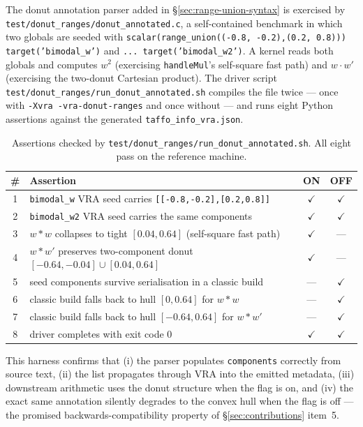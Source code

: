 \documentclass[11pt,a4paper]{article}
\theoremstyle{plain}
\begin{document}
The donut annotation parser added in \S\ref{sec:range-union-syntax}
is exercised by \texttt{test/donut\_ranges/donut\_annotated.c}, a
self-contained benchmark in which two globals are seeded with
\texttt{scalar(range\_union((-0.8,\,-0.2),(0.2,\,0.8))) target('bimodal\_w')}
and \texttt{... target('bimodal\_w2')}. A kernel reads both globals and
computes $w^2$ (exercising \texttt{handleMul}'s self-square fast
path) and $w\cdot w'$ (exercising the two-donut Cartesian product).
The driver script \texttt{test/donut\_ranges/run\_donut\_annotated.sh}
compiles the file twice --- once with \texttt{-Xvra -vra-donut-ranges}
and once without --- and runs eight Python assertions against the
generated \texttt{taffo\_info\_vra.json}.

\begin{table}[H]
\centering
\small
\begin{tabularx}{\linewidth}{@{}cXcc@{}}
\toprule
\# & Assertion & ON & OFF \\
\midrule
1 & \texttt{bimodal\_w} VRA seed carries
    \texttt{[[-0.8,-0.2],[0.2,0.8]]} & $\checkmark$ & $\checkmark$ \\
2 & \texttt{bimodal\_w2} VRA seed carries the same components
    & $\checkmark$ & $\checkmark$ \\
3 & $w*w$ collapses to tight $[0.04, 0.64]$ (self-square fast path)
    & $\checkmark$ & --- \\
4 & $w*w'$ preserves two-component donut
    $[-0.64,-0.04] \cup [0.04, 0.64]$ & $\checkmark$ & --- \\
5 & seed components survive serialisation in a classic build
    & --- & $\checkmark$ \\
6 & classic build falls back to hull $[0, 0.64]$ for $w*w$
    & --- & $\checkmark$ \\
7 & classic build falls back to hull $[-0.64, 0.64]$ for $w*w'$
    & --- & $\checkmark$ \\
8 & driver completes with exit code 0
    & $\checkmark$ & $\checkmark$ \\
\bottomrule
\end{tabularx}
\caption{Assertions checked by
\texttt{test/donut\_ranges/run\_donut\_annotated.sh}. All eight pass
on the reference machine.}
\label{tab:range-union-assertions}
\end{table}

This harness confirms that (i) the parser populates
\texttt{components} correctly from source text, (ii) the list
propagates through VRA into the emitted metadata, (iii) downstream
arithmetic uses the donut structure when the flag is on, and (iv) the
exact same annotation silently degrades to the convex hull when the
flag is off --- the promised backwards-compatibility property of
\S\ref{sec:contributions} item~5.
\end{document}
